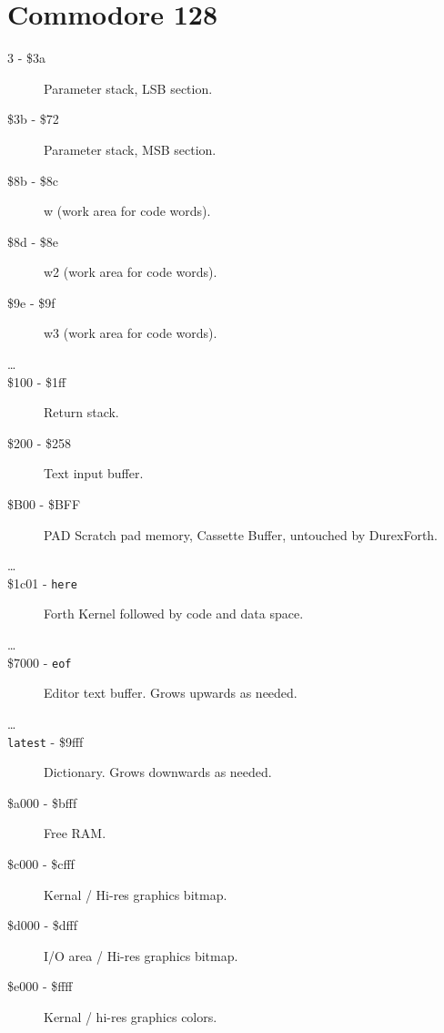 \section{Commodore 128}
\begin{description}
\item[3 - \$3a] Parameter stack, LSB section.
\item[\$3b - \$72] Parameter stack, MSB section.
\item[\$8b - \$8c] w (work area for code words).
\item[\$8d - \$8e] w2 (work area for code words).
\item[\$9e - \$9f] w3 (work area for code words).
\item[\ldots]
\item[\$100 - \$1ff] Return stack.
\item[\$200 - \$258] Text input buffer.
\item[\$B00 - \$BFF] PAD Scratch pad memory, Cassette Buffer, untouched by DurexForth. 
\item[\ldots]
\item[\$1c01 - \texttt{here}] Forth Kernel followed by code and data space.
\item[\ldots]
\item[\$7000 - \texttt{eof}] Editor text buffer. Grows upwards as needed.
\item[\ldots]
\item[\texttt{latest} - \$9fff] Dictionary. Grows downwards as needed.
\item[\$a000 - \$bfff] Free RAM.
\item[\$c000 - \$cfff] Kernal / Hi-res graphics bitmap.
\item[\$d000 - \$dfff] I/O area / Hi-res graphics bitmap.
\item[\$e000 - \$ffff] Kernal / hi-res graphics colors.

\end{description}

